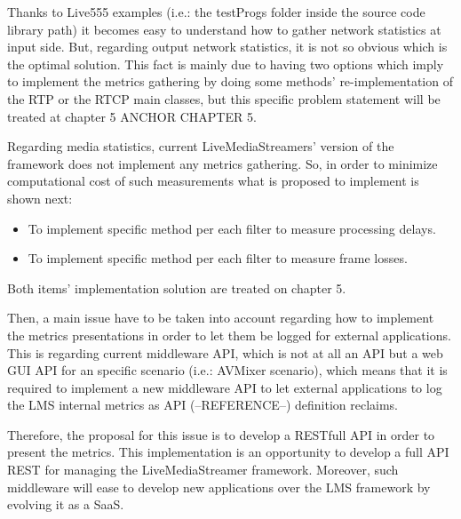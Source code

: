 Thanks to Live555 examples (i.e.: the testProgs folder inside the source code library path) it becomes easy to understand how to gather network statistics at input side. But, regarding output network statistics, it is not so obvious which is the optimal solution. This fact is mainly due to having two options which imply to implement the metrics gathering by doing some methods' re-implementation of the RTP or the RTCP main classes, but this specific problem statement will be treated at chapter 5 ANCHOR CHAPTER 5.

Regarding media statistics, current LiveMediaStreamers' version of the framework does not implement any metrics gathering. So, in order to minimize computational cost of such measurements what is proposed to implement is shown next:

\begin{itemize}
\item To implement specific method per each filter to measure processing delays.
\item To implement specific method per each filter to measure frame losses.
\end{itemize}

Both items' implementation solution are treated on chapter 5.

Then, a main issue have to be taken into account regarding how to implement the metrics presentations in order to let them be logged for external applications. This is regarding current middleware API, which is not at all an API but a web GUI API for an specific scenario (i.e.: AVMixer scenario), which means that it is required to implement a new middleware API to let external applications to log the LMS internal metrics as API (--REFERENCE--) definition reclaims. 

Therefore, the proposal for this issue is to develop a RESTfull API in order to present the metrics. This implementation is an opportunity to develop a full API REST for managing the LiveMediaStreamer framework.  Moreover, such middleware will ease to develop new applications over the LMS framework by evolving it as a SaaS. 

